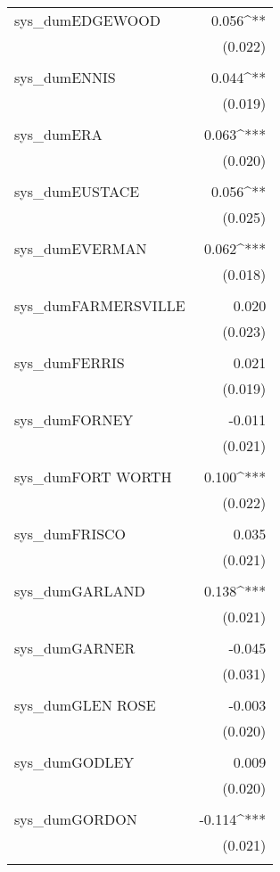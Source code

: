 \begin{table}[!htbp]
\begin{tabular}{@{\extracolsep{5pt}}lD{.}{.}{-3} }
 sys\_dumEDGEWOOD & 0.056^{**} \\ 
  & (0.022) \\ 
  & \\ 
 sys\_dumENNIS & 0.044^{**} \\ 
  & (0.019) \\ 
  & \\ 
 sys\_dumERA & 0.063^{***} \\ 
  & (0.020) \\ 
  & \\ 
 sys\_dumEUSTACE & 0.056^{**} \\ 
  & (0.025) \\ 
  & \\ 
 sys\_dumEVERMAN & 0.062^{***} \\ 
  & (0.018) \\ 
  & \\ 
 sys\_dumFARMERSVILLE & 0.020 \\ 
  & (0.023) \\ 
  & \\ 
 sys\_dumFERRIS & 0.021 \\ 
  & (0.019) \\ 
  & \\ 
 sys\_dumFORNEY & -0.011 \\ 
  & (0.021) \\ 
  & \\ 
 sys\_dumFORT WORTH & 0.100^{***} \\ 
  & (0.022) \\ 
  & \\ 
 sys\_dumFRISCO & 0.035 \\ 
  & (0.021) \\ 
  & \\ 
 sys\_dumGARLAND & 0.138^{***} \\ 
  & (0.021) \\ 
  & \\ 
 sys\_dumGARNER & -0.045 \\ 
  & (0.031) \\ 
  & \\ 
 sys\_dumGLEN ROSE & -0.003 \\ 
  & (0.020) \\ 
  & \\ 
 sys\_dumGODLEY & 0.009 \\ 
  & (0.020) \\ 
  & \\ 
 sys\_dumGORDON & -0.114^{***} \\ 
  & (0.021) \\ 
  & \\ 

\end{tabular}
\end{table}
